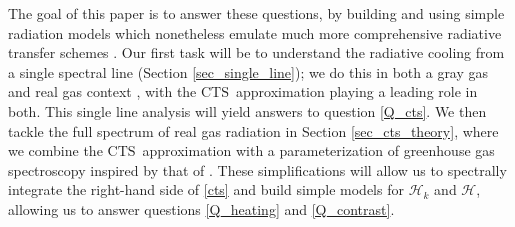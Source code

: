 \documentclass[10pt]{article}
\newcommand{\ch}{\ensuremath{\mathcal{H}}}
\newcommand{\CTS}{\ensuremath{\mathrm{CTS}}}
\begin{document}
The goal of this paper is to answer these questions, by building and using simple radiation models which nonetheless emulate much more comprehensive radiative transfer schemes \citep[see][for further discussion of this approach]{jeevanjee2017a}. Our first task will be to understand the radiative cooling from a single spectral line (Section \ref{sec_single_line}); we do this in both a gray gas and real gas context , with the \CTS\ approximation playing a leading role in both. This single line analysis will yield answers to question \ref{Q_cts}. We then tackle the full spectrum of real gas radiation in Section \ref{sec_cts_theory}, where we combine the \CTS\ approximation with a parameterization of greenhouse gas spectroscopy inspired by that of \cite{wilson2012}. These simplifications will allow us to spectrally integrate the right-hand side of \eqref{cts} and build simple models for $\ch_k$ and \ch, allowing us to answer questions \ref{Q_heating} and \ref{Q_contrast}.
\end{document}
